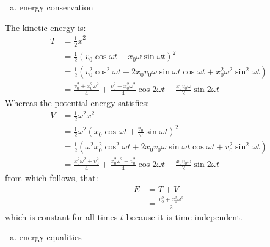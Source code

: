\documentclass[a4paper,12pt]{article}
\begin{document}
\begin{enumerate}
		\begin{enumerate}[(a)]
			\item energy conservation
		\end{enumerate}
		
		The kinetic energy is:
		\begin{align}
		T&=\frac{1}{2}\dot{x}^2\\
		&=\frac{1}{2}\left(v_0\cos\omega t-x_0\omega\sin\omega t\right)^2\\
		&=\frac{1}{2}\left(v_0^2\cos^2\omega t-2x_0v_0\omega\sin\omega t\cos\omega t+x_0^2\omega^2\sin^2\omega t\right)\\
		&=\frac{v_0^2+x_0^2\omega^2}{4}+\frac{v_0^2-x_0^2\omega^2}{4}\cos 2\omega t-\frac{x_0v_0\omega}{2}\sin2\omega t
		\end{align}
		Whereas the potential energy satisfies:
		\begin{align}
		V&=\frac{1}{2}\omega^2x^2\\
		&=\frac{1}{2}\omega^2\left(x_0\cos\omega t+\frac{v_0}{\omega}\sin\omega t\right)^2\\
		&=\frac{1}{2}\left(\omega^2x_0^2\cos^2\omega t+2x_0v_0\omega\sin\omega t\cos\omega t+v_0^2\sin^2\omega t\right)\\
		&=\frac{x_0^2\omega^2+v_0^2}{4}+\frac{x_0^2\omega^2-v_0^2}{4}\cos 2\omega t+\frac{x_0v_0\omega}{2}\sin2\omega t
		\end{align}
		from which follows, that:
		\begin{align}
		E&=T+V\\
		&=\frac{v_0^2+x_0^2\omega^2}{2}
		\end{align}
		which is constant for all times \(t\) because it is time independent.
		
		\begin{enumerate}[(b)]
			\item energy equalities
		\end{enumerate}
		

\end{enumerate}
\end{document}
